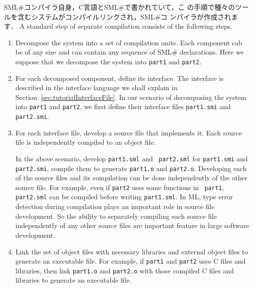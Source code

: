 \documentclass{jbook}
\newcommand{\smlsharp}{SML\#}
\begin{document}
	\smlsharp{}コンパイラ自身，C言語と\smlsharp{}で書かれていて，こ
の手順で種々のツールを含むシステムがコンパイルリンクされ，\smlsharp{}コ
ンパイラが作成されます．
\else%
	A standard step of separate compilation consists of the
following steps.
\begin{enumerate}
\item Decompose the system into a set of compilation units.
	Each component cab be of any size and can contain any sequence of
\smlsharp{} declarations.
	Here we suppose that we decompose the system into {\tt part1}
and {\tt part2}.

\item For each decomposed component, define its interface.
	The interface is described in the interface language we shall
explain in Section~\ref{sec:tutorialInterfaceFile}.
	In our scenario of decomposing the system into 
{\tt part1} and {\tt part2}, we first define their interface files
{\tt part1.smi} and {\tt part2.smi}.

\item 
	For each interface file, develop a source file that implements
it.
	Each source file is independently compiled to an object file.
	
	In the above scenario, develop {\tt part1.sml} and {\tt
part2.sml} for {\tt part1.smi} and  {\tt part2.smi}, compile them to
generate  {\tt part1.o} and {\tt part2.o}.
	Developing each of the source files and its compilation can be
done independently of the other source file. 
	For example, even if {\tt part2} uses some functions in {\tt
part1}, {\tt part2.sml} can be compiled before writing {\tt part1.sml}.
	In ML, type error detection during compilation plays an
important role in source file development.
	So the ability to separately compiling each source file
independently of any other source files are important feature in large
software development.

\item 
	Link the set of object files with necessary libraries and
external object files to generate an executable file.
	For example, if {\tt part1} and {\tt part2} uses C files
and libraries, then link {\tt part1.o} and {\tt part2.o} with those 
compiled C files and libraries to generate an executable file.
\end{enumerate}
	
\end{document}
